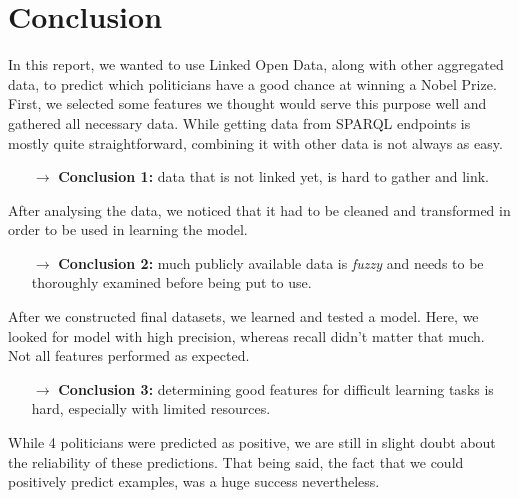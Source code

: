 \section{Conclusion}

In this report, we wanted to use Linked Open Data, along with other aggregated data, to predict which politicians have a good chance at winning a Nobel Prize. First, we selected some features we thought would serve this purpose well and gathered all necessary data. While getting data from SPARQL endpoints is mostly quite straightforward, combining it with other data is not always as easy.

\begin{itemize}
	\item[$\rightarrow$] \textbf{Conclusion 1:} data that is not linked yet, is hard to gather and link.
\end{itemize}

\noindent After analysing the data, we noticed that it had to be cleaned and transformed in order to be used in learning the model. 

\begin{itemize}
	\item[$\rightarrow$] \textbf{Conclusion 2:} much publicly available data is \emph{fuzzy} and needs to be thoroughly examined before being put to use.
\end{itemize}

\noindent After we constructed final datasets, we learned and tested a model. Here, we looked for model with high precision, whereas recall didn't matter that much. Not all features performed as expected.

\begin{itemize}
	\item[$\rightarrow$] \textbf{Conclusion 3:} determining good features for difficult learning tasks is hard, especially with limited resources.
\end{itemize}

\noindent While 4 politicians were predicted as positive, we are still in slight doubt about the reliability of these predictions. That being said, the fact that we could positively predict examples, was a huge success nevertheless. 
